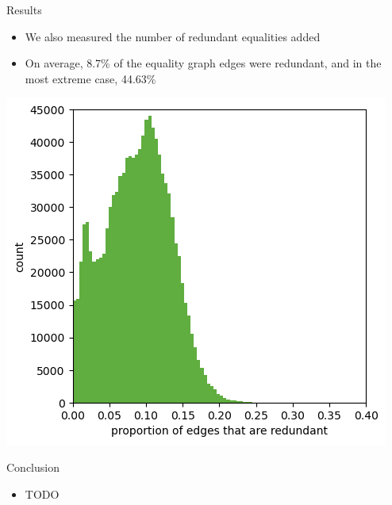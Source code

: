\documentclass[aspectratio=169]{beamer}
\newcommand\vitem{\vfill\item}
\begin{document}
\begin{frame}{Results}
  \begin{minipage}[c][0.5 \textheight]{0.46 \textwidth}
  \begin{itemize}
    \item We also measured the number of redundant equalities added
    \vitem On average, 8.7\% of the equality graph edges were redundant, and in
    the most extreme case, 44.63\%
  \end{itemize}
  \end{minipage}
  \hfill
  \begin{minipage}{0.52 \textwidth}
  \centerline{\includegraphics[width=\textwidth]{images/extra-hist.png}}
  \end{minipage}
\end{frame}

\begin{frame}{Conclusion}
  \begin{itemize}
    \item TODO
  \end{itemize}
\end{frame}
\end{document}
